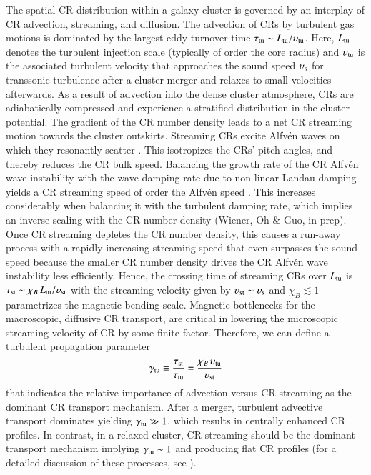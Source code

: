 \documentclass[useAMS,usenatbib]{mn2e}
\newcommand{\vel}{\upsilon}
\begin{document}
The spatial CR distribution within a galaxy cluster is governed by an interplay
of CR advection, streaming, and diffusion. The advection of CRs by turbulent gas
motions is dominated by the largest eddy turnover time $\tau_{\rmn{tu}}\sim
L_{\rmn{tu}}/ \vel_{\rmn{tu}}$. Here, $L_{{\mathrm{tu}}}$ denotes the turbulent
injection scale (typically of order the core radius) and $\vel_{\rmn{tu}}$ is
the associated turbulent velocity that approaches the sound speed
$\vel_{\rmn{s}}$ for transsonic turbulence after a cluster merger and relaxes to
small velocities afterwards. As a result of advection into the dense cluster
atmosphere, CRs are adiabatically compressed and experience a stratified
distribution in the cluster potential. The gradient of the CR number density
leads to a net CR streaming motion towards the cluster outskirts. Streaming CRs
excite Alfv{\'e}n waves on which they resonantly scatter
\citep{1969ApJ...156..445K}. This isotropizes the CRs' pitch angles, and thereby
reduces the CR bulk speed. Balancing the growth rate of the CR Alfv{\'e}n wave
instability with the wave damping rate due to non-linear Landau damping yields a
CR streaming speed of order the Alfv{\'e}n speed \citep{2001ApJ...553..198F}.
This increases considerably when balancing it with the turbulent damping rate,
which implies an inverse scaling with the CR number density (Wiener, Oh \& Guo,
in prep). Once CR streaming depletes the CR number density, this causes a
run-away process with a rapidly increasing streaming speed that even surpasses
the sound speed because the smaller CR number density drives the CR Alfv{\'e}n
wave instability less efficiently. Hence, the crossing time of streaming CRs
over $L_{{\mathrm{tu}}}$ is $\tau_{\rmn{st}}\sim \chi_B\,L_{\rmn{tu}}/
\vel_{\rmn{st}}$ with the streaming velocity given by $\vel_{\rmn{st}}\sim
\vel_{\rmn{s}}$ and $\chi_B\lesssim 1$ parametrizes the magnetic bending scale.
Magnetic bottlenecks for the macroscopic, diffusive CR transport, are critical
in lowering the microscopic streaming velocity of CR by some finite
factor. Therefore, we can define a turbulent propagation parameter
\begin{equation}
  \label{eq:gamma_tu}
  \gamma_{\rmn{tu}}\equiv\frac{\tau_{\rmn{st}}}{\tau_{\rmn{tu}}}=
  \frac{\chi_B\,\vel_{\rmn{tu}}}{\vel_{\rmn{st}}}
\end{equation}
that indicates the relative importance of advection versus CR streaming as the
dominant CR transport mechanism. After a merger, turbulent advective transport
dominates yielding $\gamma_{{\mathrm{tu}}}\gg 1$, which results in centrally enhanced
CR profiles. In contrast, in a relaxed cluster, CR streaming should be the
dominant transport mechanism implying $\gamma_{{\mathrm{tu}}}\sim1$ and producing
flat CR profiles (for a detailed discussion of these processes, see
\citealp{2011A&A...527A..99E}).
\end{document}

